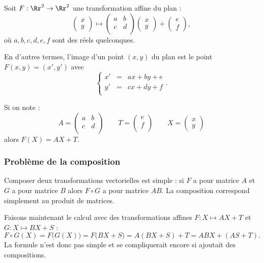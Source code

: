 \documentclass[11pt,class=report,crop=false]{standalone}
\begin{document}

Soit $F: \Rr^2 \to \Rr^2$ une transformation affine du plan :
$$
\begin{pmatrix}x \\ y \end{pmatrix} \mapsto \begin{pmatrix}a & b \\ c & d \\  \end{pmatrix}
\begin{pmatrix}x \\ y \end{pmatrix} +\begin{pmatrix} e \\ f \end{pmatrix},$$
où $a,b,c,d, e, f$ sont des réels quelconques.

En d'autres termes, l'image d'un point $(x,y)$ du plan
est le point $F(x,y) = (x',y')$ avec
$$\left \{
\begin{array}{rcl}
    x' &=& ax + by + e \\
    y' &=& cx + dy + f \\
\end{array}
\right..$$

Si on note :
$$
A =\begin{pmatrix}a & b \\ c & d \\  \end{pmatrix}
\qquad 
T =\begin{pmatrix} e \\ f \\  \end{pmatrix}
\qquad X = \begin{pmatrix}x \\ y \end{pmatrix} $$
alors $F(X) = AX+T$.

\subsubsection{Problème de la composition}

Composer deux transformations vectorielles est simple : si $F$ a pour matrice $A$ et $G$ a pour matrice $B$ alors $F \circ G$ a pour matrice $AB$. La composition correspond simplement au produit de matrices.

Faisons maintenant le calcul avec des transformations affines $F :  X \mapsto AX+T$ et $G : X \mapsto BX+S$ :
$$F \circ G (X) 
= F\big( G(X) \big) 
= F\big( BX+S \big) 
= A(BX+S) + T
= ABX + (AS+T).$$
La formule n'est donc pas simple et se compliquerait encore si ajoutait des compositions.
\end{document}
